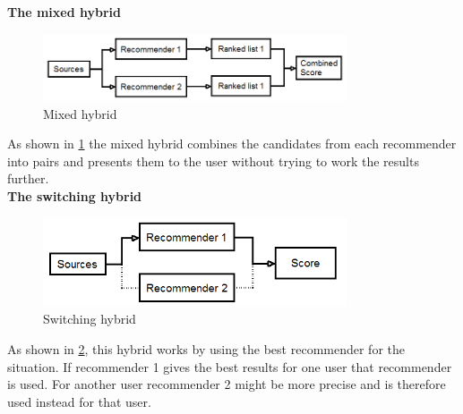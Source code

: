 \textbf{The mixed hybrid}

\begin{figure}[H]
\centering
\includegraphics[width=0.8\textwidth]{Images/Mixedhybrid.png}
\caption{Mixed hybrid}
\label{Mixed}
\end{figure}
As shown in \ref{Mixed} the mixed hybrid combines the candidates from each recommender into pairs and presents them to the user without trying to work the results further.\\

\textbf{The switching hybrid}

\begin{figure}[H]
\centering
\includegraphics[width=0.8\textwidth]{Images/Switchinghybrid.png}
\caption{Switching hybrid}
\label{Switching}
\end{figure}
As shown in \ref{Switching}, this hybrid works by using the best recommender for the situation. If recommender 1 gives the best results for one user that recommender is used. For another user recommender 2 might be more precise and is therefore used instead for that user.
